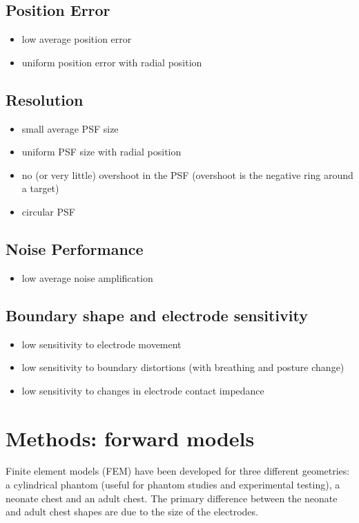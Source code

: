 \documentclass[12pt]{iopart}
\begin{document}
\subsection{Position Error}
   \begin{itemize}
   \item low average position error
   \item uniform position error with radial position
   \end{itemize}

\subsection{ Resolution}
   \begin{itemize}
   \item small average PSF size
   \item uniform PSF size with radial position
   \item no (or very little) overshoot in the PSF
  (overshoot is the negative ring around a target)
   \item circular PSF
   \end{itemize}

\subsection{ Noise Performance}
   \begin{itemize}
   \item low average noise amplification
   \end{itemize}

\subsection{ Boundary shape and electrode sensitivity}
   \begin{itemize}
   \item low sensitivity to electrode movement
   \item low sensitivity to boundary distortions
         (with breathing and posture change)
   \item low sensitivity to changes in electrode contact impedance
   \end{itemize}

\section{Methods: forward models}

Finite element models (FEM) have been developed for three
different geometries: a cylindrical phantom (useful for 
phantom studies and experimental testing), a
neonate chest and an adult chest. The primary difference
between the neonate and adult chest shapes are due to
the size of the electrodes.
\end{document}
